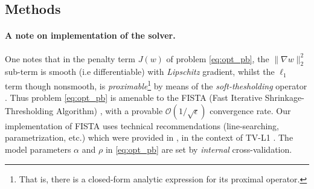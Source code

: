 \subsection{Methods}


\paragraph{A note on implementation of the solver.}
One notes that in the penalty term $J(w)$ of problem
\eqref{eq:opt_pb}, the $\|\nabla
w\|^2_2$ sub-term is smooth (i.e differentiable) with
\textit{Lipschitz} gradient, whilst the $\ell_{1}$ term though
nonsmooth, is \textit{proximable}\footnote{That is, there is a
  closed-form analytic expression for its proximal operator.} by means
of the \textit{soft-thesholding} operator  \citep{daubechies2004}.  Thus
problem \eqref{eq:opt_pb} is amenable to the FISTA (Fast Iterative
Shrinkage-Thresholding Algorithm)  \citep{beck09fista}, with a provable
$\mathcal{O}(1/\sqrt{\epsilon})$ convergence rate. Our implementation
of FISTA uses technical recommendations
(line-searching, parametrization, etc.) which were provided in
 \citep{dohmatob2014benchmarking}, in the context of TV-L1
 \citep{baldassarre2012,gramfort2013}. The model parameters $\alpha$ and
$\rho$ in \eqref{eq:opt_pb} are set by \textit{internal}
cross-validation.




